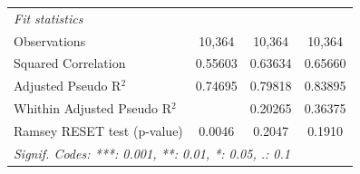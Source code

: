 \begin{tabular}{lccc}
   \midrule
   \emph{Fit statistics}\\
   Observations                  & 10,364  & 10,364          & 10,364\\  
   Squared Correlation           & 0.55603 & 0.63634         & 0.65660\\  
   Adjusted Pseudo R$^2$         & 0.74695 & 0.79818         & 0.83895\\  
   Whithin Adjusted Pseudo R$^2$ &         & 0.20265         & 0.36375\\  
   Ramsey RESET test (p-value)   & 0.0046  & 0.2047          & 0.1910\\  
   \midrule \midrule
   \multicolumn{4}{l}{\emph{Signif. Codes: ***: 0.001, **: 0.01, *: 0.05, .: 0.1}}\\
\end{tabular}
\par\endgroup


